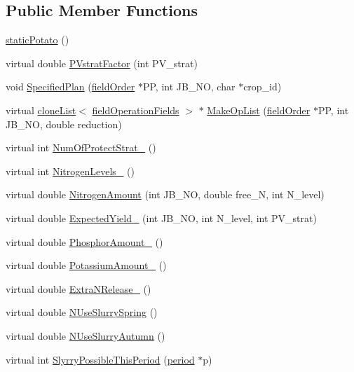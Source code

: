 \subsection*{Public Member Functions}
\begin{DoxyCompactItemize}
\item 
\hyperlink{classstatic_potato_a56c75183e4ef8ad16971e8174ff723e9}{staticPotato} ()
\item 
virtual double \hyperlink{classstatic_potato_a4ffc6382bc93ee2d70ca6007548d5501}{PVstratFactor} (int PV\_\-strat)
\item 
void \hyperlink{classstatic_potato_aa6aed82be9c7c1e9e678bae6fdd7422c}{SpecifiedPlan} (\hyperlink{classfield_order}{fieldOrder} $\ast$PP, int JB\_\-NO, char $\ast$crop\_\-id)
\item 
virtual \hyperlink{classclone_list}{cloneList}$<$ \hyperlink{classfield_operation_fields}{fieldOperationFields} $>$ $\ast$ \hyperlink{classstatic_potato_ad9c39d522caf3253ba0e10b240c9ede8}{MakeOpList} (\hyperlink{classfield_order}{fieldOrder} $\ast$PP, int JB\_\-NO, double reduction)
\item 
virtual int \hyperlink{classstatic_potato_a04dc5840220a6ecc1bac5688a80821ae}{NumOfProtectStrat\_\-} ()
\item 
virtual int \hyperlink{classstatic_potato_a7471a5c80f252c89ca3fc9cb0d12c619}{NitrogenLevels\_\-} ()
\item 
virtual double \hyperlink{classstatic_potato_a31f9e7eda42f5d73982b2704728d7c1c}{NitrogenAmount} (int JB\_\-NO, double free\_\-N, int N\_\-level)
\item 
virtual double \hyperlink{classstatic_potato_a6e59765e958566c544bc53669160f6d7}{ExpectedYield\_\-} (int JB\_\-NO, int N\_\-level, int PV\_\-strat)
\item 
virtual double \hyperlink{classstatic_potato_a8b19a738a31bc248a422ea7f8b3246f2}{PhosphorAmount\_\-} ()
\item 
virtual double \hyperlink{classstatic_potato_a0eed9f043dcf8b89cb95e62b8bdd533b}{PotassiumAmount\_\-} ()
\item 
virtual double \hyperlink{classstatic_potato_a7c404064c9e42ef804e9d4cf795f2759}{ExtraNRelease\_\-} ()
\item 
virtual double \hyperlink{classstatic_potato_aff8cbc0d6e8ffba511cc2ed8ca63dc6e}{NUseSlurrySpring} ()
\item 
virtual double \hyperlink{classstatic_potato_ad28100ca6e12fc541684b794fea058d2}{NUseSlurryAutumn} ()
\item 
virtual int \hyperlink{classstatic_potato_aca4f659ad1d189547df0b8336e8abcf6}{SlyrryPossibleThisPeriod} (\hyperlink{classperiod}{period} $\ast$p)
\end{DoxyCompactItemize}


